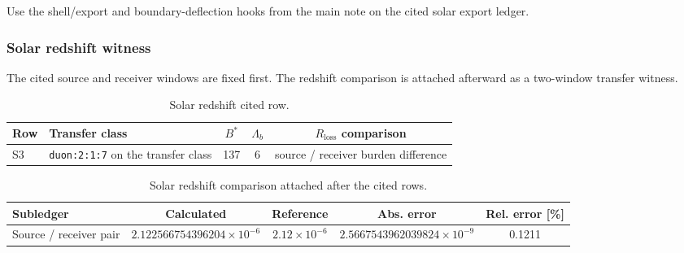 Use the shell/export and boundary-deflection hooks from the main note on the cited solar export ledger.

\subsubsection{Solar redshift witness}
\label{man:solar-redshift-witness}

The cited source and receiver windows are fixed first. The redshift comparison is attached afterward as a two-window transfer witness.\par\smallskip
{}

\begin{table}[H]
\centering
\caption{Solar redshift cited row.}
\label{tab:solar-redshift-row}
\begin{threeparttable}
\small
\begin{tabularx}{\linewidth}{@{}lXccc@{}}
\toprule
Row & Transfer class & $B^*$ & $\Lambda_b$ & $R_{\mathrm{loss}}$ comparison \\
\midrule
S3 & \texttt{duon:2:1:7} on the transfer class & 137 & 6 & source / receiver burden difference \\
\bottomrule
\end{tabularx}
\end{threeparttable}
\end{table}

\begin{table}[H]
\centering
\caption{Solar redshift comparison attached after the cited rows.}
\label{tab:solar-redshift-comparison}
\begin{threeparttable}
\small
\begin{tabularx}{\linewidth}{@{}lcccc@{}}
\toprule
Subledger & Calculated & Reference & Abs. error & Rel. error [\%] \\
\midrule
Source / receiver pair & $2.122566754396204\times10^{-6}$ & $2.12\times10^{-6}$ & $2.5667543962039824\times10^{-9}$ & 0.1211 \\
\bottomrule
\end{tabularx}
\end{threeparttable}
\end{table}

